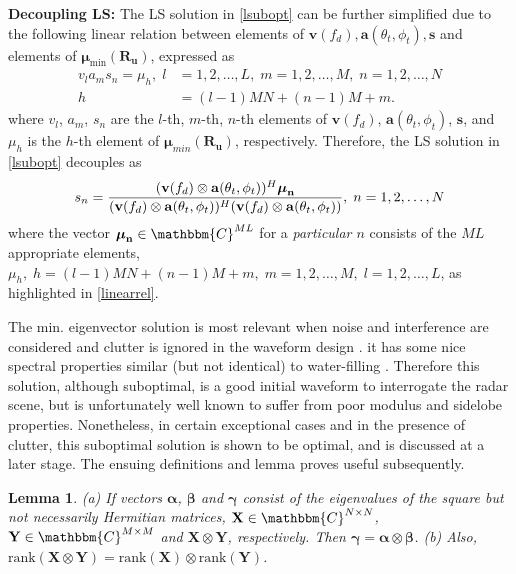 \documentclass[11pt,draftclsnofoot,onecolumn]{IEEEtran}
\newtheorem{lem}{\bf {Lemma}}
\theoremstyle{definition}
\theoremstyle{remark}
\begin{document}
 {\bf Decoupling LS:} The LS solution in \eqref{lsubopt} can be further simplified due to the following linear relation between elements of $\mathbf{v}(f_d),\mathbf{a}(\theta_t,\phi_t),\mathbf{s}$ and elements of $\boldsymbol{\mu}_{\min}(\mathbf{R_u})$, expressed as
\begin{align} \label{linearrel}
v_la_ms_n=\mu_h,\; l&=1,2,\ldots,L,\;m=1,2,\ldots,M,\;n=1,2,\ldots,N \nonumber \\
h&=(l-1)MN+(n-1)M+m.
\end{align}
where $v_l$, $a_m$, $s_n$ are the $l$-th, $m$-th, $n$-th elements of $\mathbf{v}(f_d)$, $\mathbf{a}(\theta_t,\phi_t)$, $\mathbf{s}$, and $\mu_h$ is the $h$-th element of $\boldsymbol{\mu}_{min}(\mathbf{R_u})$, respectively. Therefore, the LS solution in \eqref{lsubopt} decouples as
\begin{align} \label{lsfinal}
s_n=\frac{(\mathbf{v}(f_d)\otimes\mathbf{a}(\theta_t,\phi_t) )^H\boldsymbol{\mu}_{\bf n} }{(\mathbf{v}(f_d)\otimes\mathbf{a}(\theta_t,\phi_t) )^H(\mathbf{v}(f_d)\otimes\mathbf{a}(\theta_t,\phi_t) )},\; n=1,2,\ldots,N
\end{align}
where the vector $\boldsymbol{\mu}_{\bf n}\in\mathbbm{C}^{ML}$ for a {\it particular $n$} consists of the $ML$ appropriate elements, $\mu_h,\; h=(l-1)MN+(n-1)M+m,\;  m=1,2,\ldots,M, \;l=1,2,\ldots,L$, as highlighted in \eqref{linearrel}.

The min. eigenvector solution is most relevant when noise and interference are considered and clutter is ignored in the waveform design \cite{guerci2003}. it has some nice spectral properties  similar (but not identical) to water-filling \cite{guerci2003,bell1993information}. Therefore this solution, although suboptimal, is a good initial waveform to  interrogate the radar scene, but is unfortunately well known to suffer from poor modulus and sidelobe properties. Nonetheless, in certain exceptional cases and in the presence of clutter, this suboptimal solution is shown to be optimal, and is discussed at a later stage. The ensuing definitions and lemma proves useful subsequently.
\begin{lem} \label{lemma1}
(a) If vectors $\boldsymbol{\alpha}$, $\boldsymbol{\beta}$ and $\boldsymbol{\gamma}$ consist of the eigenvalues of the square but not necessarily Hermitian matrices, $\mathbf{X}\in\mathbbm{C}^{N\times N}$, $\mathbf{Y}\in\mathbbm{C}^{M\times M}$ and $\mathbf{X}\otimes\mathbf{Y}$, respectively. Then $\boldsymbol{\gamma}=\boldsymbol{\alpha}\otimes\boldsymbol{\beta}$. (b) Also,  $\mathrm{rank}(\mathbf{X}\otimes\mathbf{Y})=\mathrm{rank}(\mathbf{X})\otimes\mathrm{rank}(\mathbf{Y})$.
\end{lem}
\end{document}
